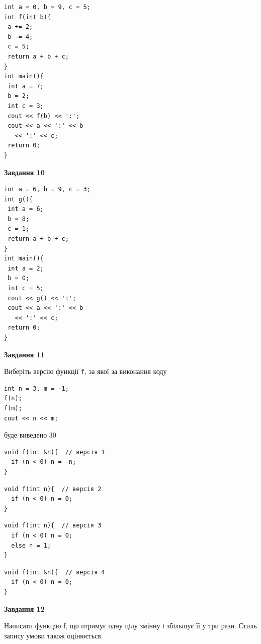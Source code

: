 \documentclass[12pt, ukrainian]{article}
\def\code#1{\Verb!#1!}
\begin{document}
{\begin {large}
\begin{minipage}[t]{7.0cm}
\begin{verbatim}
int a = 0, b = 9, c = 5;
int f(int b){
 a += 2;
 b -= 4;
 c = 5;
 return a + b + c;
}
int main(){
 int a = 7;
 b = 2;
 int c = 3;
 cout << f(b) << ':';
 cout << a << ':' << b 
   << ':' << c;
 return 0;
}
\end{verbatim}



\begin{center}
\textbf{Завдання 10}
\end{center}
\vspace{-8mm}

\begin{verbatim}
int a = 6, b = 9, c = 3;
int g(){
 int a = 6;
 b = 8;
 c = 1;
 return a + b + c;
}
int main(){
 int a = 2;
 b = 0;
 int c = 5;
 cout << g() << ':';
 cout << a << ':' << b 
   << ':' << c;
 return 0;
}
\end{verbatim}

\end{minipage}
\vline \hspace{1mm}
\begin{minipage}[t]{11.0cm}

\begin{center}
\textbf{Завдання 11}
\end{center}
Виберіть версію функції \code{f}, за якої за виконання коду
\begin{verbatim}
int n = 3, m = -1;
f(n);
f(m);
cout << n << m;
\end{verbatim}

буде виведено 30

\begin{verbatim}
void f(int &n){  // версія 1
  if (n < 0) n = -n;
}
\end{verbatim}

\vspace{-8mm}\begin{verbatim}
void f(int n){  // версія 2
  if (n < 0) n = 0;
}
\end{verbatim}

\vspace{-8mm}\begin{verbatim}
void f(int n){  // версія 3
  if (n < 0) n = 0;
  else n = 1;
}
\end{verbatim}

\vspace{-8mm}\begin{verbatim}
void f(int &n){  // версія 4
  if (n < 0) n = 0;
}
\end{verbatim}



\begin{center}
\textbf{Завдання 12}
\end{center}

Написати функцiю f, що отримує одну цiлу змінну i збiльшує її у три рази. Стиль запису умови також оцінюється.\par

\end{minipage}

\end {large}}
\newpage
\end{document}
